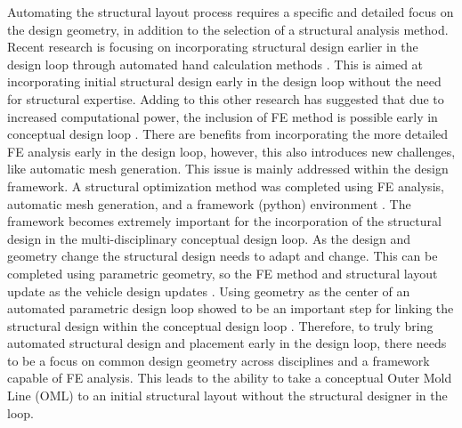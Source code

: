 \documentclass[conf]{new-aiaa}
\begin{document}
Automating the structural layout process requires a specific and 
detailed focus on the design geometry, in addition to the selection 
of a structural analysis method. 
Recent research is focusing on incorporating structural design earlier 
in the design loop through automated hand calculation methods 
\cite{horvath_aircraft_conceptual_structural_design_using_AMMIT}.
This is aimed at incorporating initial structural design early in the design loop 
without the need for structural expertise. 
Adding to this other research has suggested that due to increased 
computational power, the inclusion of FE method
is possible early in conceptual design loop 
\cite{mason_conceptual_design_shop_tool_for_rapid_airframe_structural_modeling}.
There are benefits from incorporating the more detailed FE 
analysis early in the design loop, however, this also 
introduces new challenges, like automatic mesh generation. 
This issue is mainly addressed within the design framework.  
A structural optimization method was completed using FE analysis, 
automatic mesh generation, and a framework (python) environment 
\cite{hwang_geometry_and_structural_modeling_for_high_fidelity_aircraft_design_opt}.
The framework becomes extremely important for the incorporation of the structural 
design in the multi-disciplinary conceptual design loop. 
As the design and geometry change the structural design needs to adapt and change. 
This can be completed using parametric geometry, 
so the FE method and structural layout update as the vehicle design updates 
\cite{padula_structural_analysis_in_a_conceptual_design_framework}.
Using geometry as the center of an automated parametric design loop showed to be 
an important step for linking the structural design within the conceptual 
design loop 
\cite{lazzara_on_structural_layout_using_multifidelity_geometry_in_aircraft_design,
      bryson_framework_for_multifidelity_aeroelastic_vehicle_design_opt}.
Therefore, to truly bring automated structural design and placement 
early in the design loop, there needs to be a focus on common design 
geometry across disciplines and a framework capable of FE analysis. 
This leads to the ability to take a conceptual 
Outer Mold Line (OML) to an initial structural layout without the 
structural designer in the loop.
\end{document}
